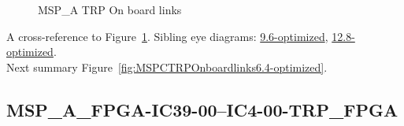 \begin{figure}[h]
\begin{subfigure}{0.25\textwidth}
\hyperref[sec:MSPAFPGAIC3924IC424TRPFPGA6.4-optimized]{}
\end{subfigure}\hspace*{\fill}
\begin{subfigure}{0.25\textwidth}
\hyperref[sec:MSPAFPGAIC3925IC425TRPFPGA6.4-optimized]{}
\end{subfigure}\hspace*{\fill}
\begin{subfigure}{0.25\textwidth}
\hyperref[sec:MSPAFPGAIC3926IC426TRPFPGA6.4-optimized]{}
\end{subfigure}\hspace*{\fill}
\begin{subfigure}{0.25\textwidth}
\hyperref[sec:MSPAFPGAIC3927IC427TRPFPGA6.4-optimized]{}
\end{subfigure}

\caption{MSP\_A TRP On board links} \label{fig:MSPATRPOnboardlinks6.4-optimized}
\end{figure}

A cross-reference to Figure~\ref{fig:MSPATRPOnboardlinks6.4-optimized}.
Sibling eye diagrams: \hyperref[sec:MSPATRPOnboardlinks9.6-optimized]{9.6-optimized}, \hyperref[sec:MSPATRPOnboardlinks12.8-optimized]{12.8-optimized}. \\
Next summary Figure~\ref{fig:MSPCTRPOnboardlinks6.4-optimized}.
\clearpage
% 
\subsection{MSP\_A\_FPGA-IC39-00--IC4-00-TRP\_FPGA}\label{sec:MSPAFPGAIC3900IC400TRPFPGA6.4-optimized}

